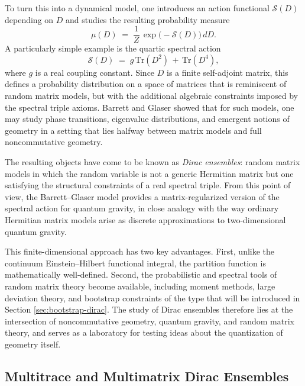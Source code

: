\documentclass[11pt]{article}
\theoremstyle{plain}
\begin{document}
To turn this into a dynamical model, one introduces an action functional $\mathcal{S}(D)$ depending on $D$ and studies the resulting probability measure
\[
\mu(D) \;=\; \frac{1}{Z}\, \exp\!\bigl(-\mathcal{S}(D)\bigr)\, dD.
\]
 A particularly simple example is the quartic spectral action
\[
\mathcal{S}(D)
  \;=\; g\, \mathrm{Tr}(D^2) \,+\, \mathrm{Tr}(D^4),
\]
where $g$ is a real coupling constant. Since $D$ is a finite self-adjoint matrix, this defines a probability distribution on a space of matrices that is reminiscent of random matrix models, but with the additional algebraic constraints imposed by the spectral triple axioms. Barrett and Glaser showed that for such models, one may study phase transitions, eigenvalue distributions, and emergent notions of geometry in a setting that lies halfway between matrix models and full noncommutative geometry. 

The resulting objects have come to be known as \emph{Dirac ensembles}: random matrix models in which the random variable is not a generic Hermitian matrix but one satisfying the structural constraints of a real spectral triple. From this point of view, the Barrett--Glaser model provides a matrix-regularized version of the spectral action for quantum gravity, in close analogy with the way ordinary Hermitian matrix models arise as discrete approximations to two-dimensional quantum gravity. 

This finite-dimensional approach has two key advantages. First, unlike the continuum Einstein--Hilbert functional integral, the partition function is mathematically well-defined. Second, the probabilistic and spectral tools of random matrix theory become available, including moment methods, large deviation theory, and bootstrap constraints of the type that will be introduced in Section \ref{sec:bootstrap-dirac}. The study of Dirac ensembles therefore lies at the intersection of noncommutative geometry, quantum gravity, and random matrix theory, and serves as a laboratory for testing ideas about the quantization of geometry itself.

\subsection{Multitrace and Multimatrix Dirac Ensembles}
\label{sec:multitrace}
\end{document}
